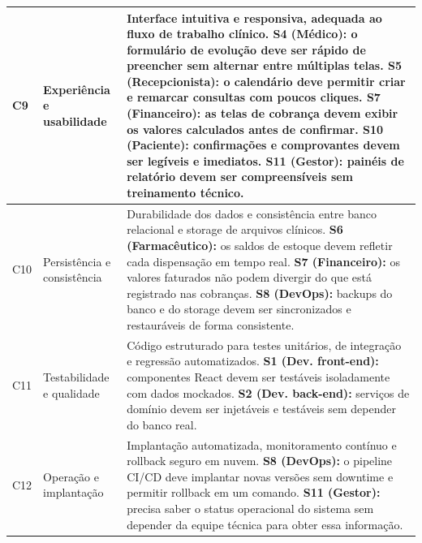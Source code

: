 \begin{longtable}{|l|l|p{9.5cm}|}
\hline
C9 & Experiência e usabilidade &
Interface intuitiva e responsiva, adequada ao fluxo de trabalho clínico.
\newline\textbf{S4 (Médico):} o formulário de evolução deve ser rápido de preencher sem alternar entre múltiplas telas.
\newline\textbf{S5 (Recepcionista):} o calendário deve permitir criar e remarcar consultas com poucos cliques.
\newline\textbf{S7 (Financeiro):} as telas de cobrança devem exibir os valores calculados antes de confirmar.
\newline\textbf{S10 (Paciente):} confirmações e comprovantes devem ser legíveis e imediatos.
\newline\textbf{S11 (Gestor):} painéis de relatório devem ser compreensíveis sem treinamento técnico. \\
\hline
C10 & Persistência e consistência &
Durabilidade dos dados e consistência entre banco relacional e storage de arquivos clínicos.
\newline\textbf{S6 (Farmacêutico):} os saldos de estoque devem refletir cada dispensação em tempo real.
\newline\textbf{S7 (Financeiro):} os valores faturados não podem divergir do que está registrado nas cobranças.
\newline\textbf{S8 (DevOps):} backups do banco e do storage devem ser sincronizados e restauráveis de forma consistente. \\
\hline
C11 & Testabilidade e qualidade &
Código estruturado para testes unitários, de integração e regressão automatizados.
\newline\textbf{S1 (Dev. front-end):} componentes React devem ser testáveis isoladamente com dados mockados.
\newline\textbf{S2 (Dev. back-end):} serviços de domínio devem ser injetáveis e testáveis sem depender do banco real. \\
\hline
C12 & Operação e implantação &
Implantação automatizada, monitoramento contínuo e rollback seguro em nuvem.
\newline\textbf{S8 (DevOps):} o pipeline CI/CD deve implantar novas versões sem downtime e permitir rollback em um comando.
\newline\textbf{S11 (Gestor):} precisa saber o status operacional do sistema sem depender da equipe técnica para obter essa informação. \\
\hline
 
\end{longtable}
 
